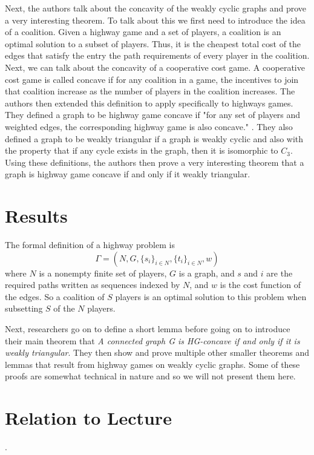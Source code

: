 \documentclass{article}
\begin{document}
 
  Next, the authors talk about the concavity of the weakly cyclic graphs and prove a very interesting theorem. To talk about this we first need to introduce the idea of a coalition. Given a highway game and a set of players, a coalition is an optimal solution to a subset of players. Thus, it is the cheapest total cost of the edges that satisfy the entry the path requirements of every player in the coalition. Next, we can talk about the concavity of a cooperative cost game. A cooperative cost game is called concave if for any coalition in a game, the incentives to join that coalition increase as the number of players in the coalition increases. The authors then extended this definition to apply specifically to highways games. They defined a graph to be highway game concave if "for any set of players and weighted edges, the corresponding highway game is also concave." \cite{high}. They also defined a graph to be weakly triangular if a graph is weakly cyclic and also with the property that if any cycle exists in the graph, then it is isomorphic to \(C_3\). Using these definitions, the authors then prove a very interesting theorem that a graph is highway game concave if and only if it weakly triangular. 



\section{Results}
The formal definition of a highway problem is 
\[
\Gamma = (N,G,\{s_i\}_{i\in N} , \{t_i\}_{i\in N} ,w)
\]
where \(N\) is a nonempty finite set of players, \(G\) is a graph, and \(s\) and \(i\) are the required paths written as sequences indexed by \(N\), and \(w\) is the cost function of the edges. So a coalition of \(S\) players is an optimal solution to this problem when subsetting \(S\) of the \(N\) players. 

Next, researchers go on to define a short lemma before going on to introduce their main theorem that \textit{A connected graph G is HG-concave if and only if it is weakly triangular}. They then show and prove multiple other smaller theorems and lemmas that result from highway games on weakly cyclic graphs. Some of these proofs are somewhat technical in nature and so we will not present them here. 

\section{Relation to Lecture}. 
\end{document}
